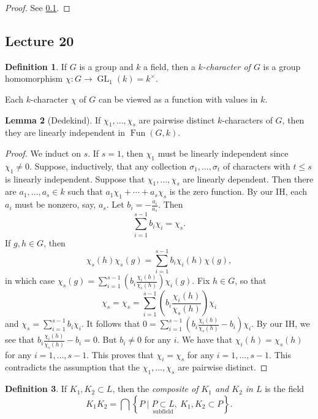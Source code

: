 \documentclass[10pt,letterpaper,cm]{nupset}
\theoremstyle{definition}
\newtheorem{definition}{Definition}[subsection]
\theoremstyle{theorem}
\newtheorem{lemma}[definition]{Lemma}
\theoremstyle{remark}
\newcommand{\1}{\mathbf{1}}
\newcommand{\0}{\vec 0}
\DeclareMathOperator*{\GL}{GL}
\DeclareMathOperator{\Fun}{Fun}
\begin{document}
\begin{proof}
See \cref{20}.
\end{proof}

\subsection{Lecture 20}\label{20}

\begin{definition}
If $G$ is a group and $k$ a field, then a \textit{$k$-character of $G$} is a group homomorphism $\chi : G \to \GL_1(k) =k^{\times}$.
\end{definition}


Each $k$-character $\chi$ of $G$ can be viewed as a function with values in $k$.


\begin{lemma}[Dedekind]
If $\chi_1, \ldots, \chi_s$ are pairwise distinct $k$-characters of $G$, then they are linearly independent in $\Fun(G, k)$.
\end{lemma}
\begin{proof}
We induct on $s$. If $s=1$, then $\chi_1$ must be linearly independent since $\chi_1 \ne 0$. Suppose, inductively, that any collection $\sigma_1, \ldots, \sigma_t$ of characters with $t\leq s$ is linearly independent. Suppose that $\chi_1, \ldots, \chi_s$ are linearly dependent. Then there are $a_1, \ldots, a_s\in k$ such that $a_1\chi_1 + \cdots + a_s\chi_s$ is the zero function. By our IH, each $a_i$ must be nonzero, say, $a_s$. Let $b_i = {-\frac{a_i}{a_s}}$. Then $$\sum_{i=1}^{s-1} b_i\chi_i  = \chi_s.$$  If $g,h \in G$, then $$  \chi_s(h)\chi_s(g) = \sum_{i=1}^{s-1} b_i\chi_i(h)\chi(g)   ,$$ in which case $\chi_s(g)  = \sum_{i=1}^{s-1} (b_i \frac{\chi_i(h)}{\chi_s(h)})\chi_i(g) .$ Fix $h\in G$, so that $$\chi_s = \chi_s  = \sum_{i=1}^{s-1} (b_i \frac{\chi_i(h)}{\chi_s(h)})\chi_i $$ and $\chi_s = \sum_{i=1}^{s-1} b_i \chi_i$. It follows that $0 =   \sum_{i=1}^{s-1} (b_i \frac{\chi_i(h)}{\chi_s(h)} -b_i)\chi_i$. By our IH, we see that $b_i \frac{\chi_i(h)}{\chi_s(h)} - b_i =0$. But $b_i \ne 0$ for any $i$. We have that $\chi_i(h) = \chi_s(h)$ for any $i=1, \ldots, s-1$. This proves that $\chi_i = \chi_s$ for any $i=1, \ldots, s-1$. This contradicts the assumption that the $\chi_1, \ldots, \chi_s$ are pairwise distinct. 
\end{proof}

\begin{definition}
If $K_1, K_2 \subset L$, then the \textit{composite of $K_1$ and $K_2$ in $L$} is the field  $$ K_1K_2 = \bigcap \left\{P \mid  \underset{\text{subfield}}{P\subset L}, \ K_1, K_2 \subset P\right\}  .$$ 
\end{definition}
\end{document}
